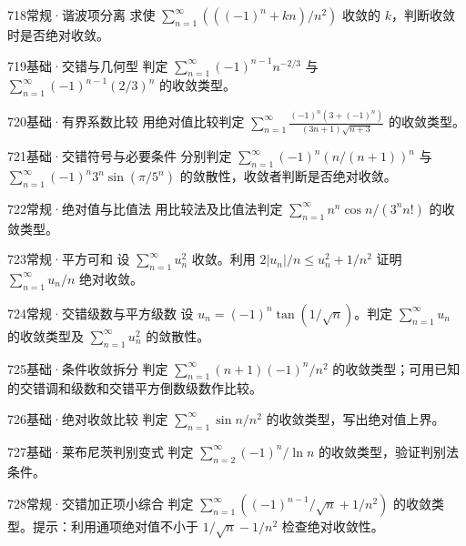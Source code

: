 \begin{exercise}{718}{常规·谐波项分离}
求使 $\sum_{n=1}^{\infty}(((-1)^n+kn)/n^2)$ 收敛的 $k$，判断收敛时是否绝对收敛。
\end{exercise}
\begin{exercise}{719}{基础·交错与几何型}
判定 $\sum_{n=1}^{\infty}(-1)^{n-1}n^{-2/3}$ 与 $\sum_{n=1}^{\infty}(-1)^{n-1}(2/3)^n$ 的收敛类型。
\end{exercise}
\begin{exercise}{720}{基础·有界系数比较}
用绝对值比较判定 $\sum_{n=1}^{\infty}\frac{(-1)^n(3+(-1)^n)}{(3n+1)\sqrt{n+3}}$ 的收敛类型。
\end{exercise}
\begin{exercise}{721}{基础·交错符号与必要条件}
分别判定 $\sum_{n=1}^{\infty}(-1)^n(n/(n+1))^n$ 与 $\sum_{n=1}^{\infty}(-1)^n3^n\sin(\pi/5^n)$ 的敛散性，收敛者判断是否绝对收敛。
\end{exercise}
\begin{exercise}{722}{常规·绝对值与比值法}
用比较法及比值法判定 $\sum_{n=1}^{\infty}n^n\cos n/(3^nn!)$ 的收敛类型。
\end{exercise}
\begin{exercise}{723}{常规·平方可和}
设 $\sum_{n=1}^{\infty}u_n^2$ 收敛。利用 $2|u_n|/n\leq u_n^2+1/n^2$ 证明 $\sum_{n=1}^{\infty}u_n/n$ 绝对收敛。
\end{exercise}
\begin{exercise}{724}{常规·交错级数与平方级数}
设 $u_n=(-1)^n\tan(1/\sqrt n)$。判定 $\sum_{n=1}^{\infty}u_n$ 的收敛类型及 $\sum_{n=1}^{\infty}u_n^2$ 的敛散性。
\end{exercise}
\begin{exercise}{725}{基础·条件收敛拆分}
判定 $\sum_{n=1}^{\infty}(n+1)(-1)^n/n^2$ 的收敛类型；可用已知的交错调和级数和交错平方倒数级数作比较。
\end{exercise}
\begin{exercise}{726}{基础·绝对收敛比较}
判定 $\sum_{n=1}^{\infty}\sin n/n^2$ 的收敛类型，写出绝对值上界。
\end{exercise}
\begin{exercise}{727}{基础·莱布尼茨判别变式}
判定 $\sum_{n=2}^{\infty}(-1)^n/\ln n$ 的收敛类型，验证判别法条件。
\end{exercise}
\begin{exercise}{728}{常规·交错加正项小综合}
判定 $\sum_{n=1}^{\infty}((-1)^{n-1}/\sqrt n+1/n^2)$ 的收敛类型。提示：利用通项绝对值不小于 $1/\sqrt n-1/n^2$ 检查绝对收敛性。
\end{exercise}
